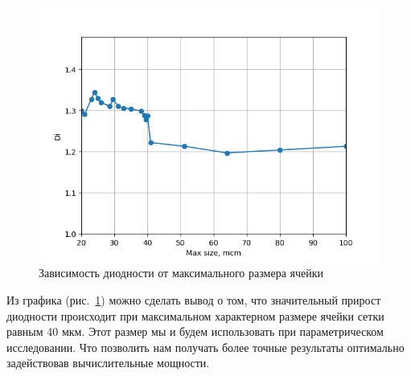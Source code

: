 \documentclass[14pt,a4paper]{article}
\begin{document}
                    
         
         \begin{figure}[H]
             \centering
             \includegraphics[width = 1\linewidth]{graphDiMaxSize}
             \caption{Зависимость диодности от максимального размера ячейки}
             \label{fig:graphDiMaxSize}
         \end{figure}
         
         Из графика (рис.~\ref{fig:graphDiMaxSize}) можно сделать вывод о том, что значительный прирост диодности происходит при максимальном характерном размере ячейки сетки равным 40 мкм. Этот размер мы и будем использовать при параметрическом исследовании. Что позволить нам получать более точные результаты оптимально задействовав вычислительные мощности. 

         \printbibliography
\end{document}
